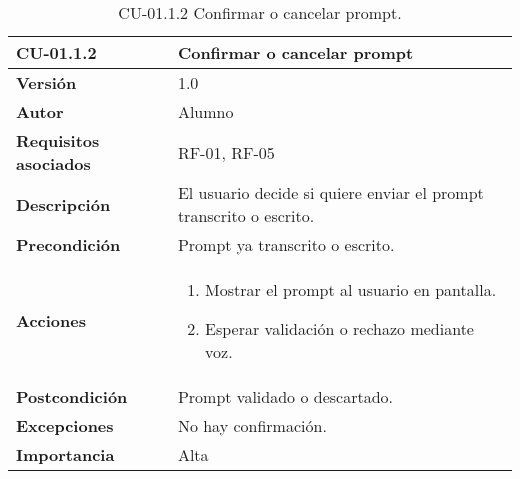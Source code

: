 \begin{table}[p]
    \centering
    \begin{tabularx}{\linewidth}{ p{} p{} }
        \toprule
        \textbf{CU-01.1.2}    & \textbf{Confirmar o cancelar prompt}\\
        \toprule
        \textbf{Versión}              & 1.0 \\
        \textbf{Autor}                & Alumno \\
        \textbf{Requisitos asociados} & RF-01, RF-05 \\
        \textbf{Descripción}          & El usuario decide si quiere enviar el prompt transcrito o escrito.\\
        \textbf{Precondición}         & Prompt ya transcrito o escrito.\\
        \textbf{Acciones}             &
        \begin{enumerate}
          \item Mostrar el prompt al usuario en pantalla.
          \item Esperar validación o rechazo mediante voz.
        \end{enumerate}\\
        \textbf{Postcondición}        & Prompt validado o descartado.\\
        \textbf{Excepciones}          & No hay confirmación.\\
        \textbf{Importancia}          & Alta \\
        \bottomrule
    \end{tabularx}
    \caption{CU-01.1.2 Confirmar o cancelar prompt.}
    \label{CU-01.1.2 Confirmar o cancelar prompt}
\end{table}

